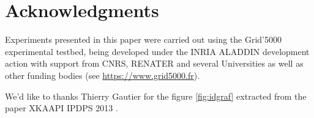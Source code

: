 \documentclass[10pt, conference, compsocconf,pdftex,dvipsnames]{IEEEtran}
\begin{document}
\section*{Acknowledgments}

Experiments presented in this paper were carried out using the Grid'5000
experimental testbed, being developed under the INRIA ALADDIN development 
action with support from CNRS, RENATER and several Universities as well as
other funding bodies (see \url{https://www.grid5000.fr}).


We'd like to thanks Thierry Gautier for the figure \ref{fig:idgraf} extracted
from the paper XKAAPI IPDPS 2013 \cite{gautierxkaapi}.






\listoftodos



\end{document}
